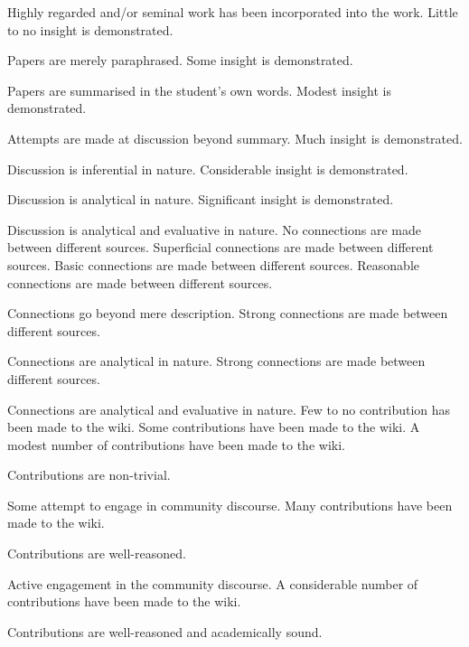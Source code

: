 \documentclass{../../fal_assignment}
\begin{document}
\begin{markingrubric}
        \par 		Highly regarded and/or seminal work has been incorporated into the work.
%
        \grade\fail Little to no insight is demonstrated.
        \par		Papers are merely paraphrased.
        \grade		Some insight is demonstrated.
        \par		Papers are summarised in the student's own words.
        \grade		Modest insight is demonstrated.
        \par		Attempts are made at discussion beyond summary.
        \grade		Much insight is demonstrated.
        \par		Discussion is inferential in nature.
        \grade		Considerable insight is demonstrated.
        \par		Discussion is analytical in nature.
        \grade		Significant insight is demonstrated.
        \par		Discussion is analytical and evaluative in nature.
%
        \grade\fail No connections are made between different sources.
        \grade		Superficial connections are made between different sources.
        \grade		Basic connections are made between different sources.
        \grade		Reasonable connections are made between different sources.
        \par		Connections go beyond mere description.
        \grade		Strong connections are made between different sources.
        \par		Connections are analytical in nature.
        \grade		Strong connections are made between different sources.
        \par		Connections are analytical and evaluative in nature.
%
        \grade\fail 	Few to no contribution has been made to the wiki.
        \grade 		Some contributions have been made to the wiki.
        \grade 		A modest number of contributions have been made to the wiki.
        \par		Contributions are non-trivial.
        \par		Some attempt to engage in community discourse.
        \grade 		Many contributions have been made to the wiki.
        \par		Contributions are well-reasoned.
        \par		Active engagement in the community discourse.
        \grade 		A considerable number of contributions have been made to the wiki.
        \par		Contributions are well-reasoned and academically sound.

\end{markingrubric}
\end{document}

